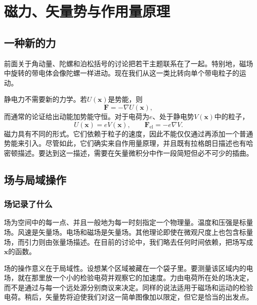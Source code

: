 \chapter{磁力、矢量势与作用量原理}


\section{一种新的力}

前面关于角动量、陀螺和泊松括号的讨论把若干主题联系在了一起。特别地，磁场中旋转的带电体会像陀螺一样进动。现在我们从这一类比转向单个带电粒子的运动。

静电力不需要新的力学。若\(U(\mathbf x)\)是势能，则
\begin{equation}
  \mathbf F=-\nabla U(\mathbf x),
\end{equation}
而通常的论证给出动能加势能守恒。对于电荷为\(e\)、处于静电势\(V(\mathbf x)\)中的粒子，
\begin{equation}
  U(\mathbf x)=eV(\mathbf x),
  \qquad
  \mathbf F_{\mathrm{el}}=-e\nabla V.
\end{equation}
磁力具有不同的形式。它们依赖于粒子的速度，因此不能仅仅通过再添加一个普通势能来引入。尽管如此，它们确实来自作用量原理，并且既有拉格朗日描述也有哈密顿描述。要达到这一描述，需要在矢量微积分中作一段简短但必不可少的插曲。

\section{场与局域操作}

\subsection{场记录了什么}

场为空间中的每一点、并且一般地为每一时刻指定一个物理量。温度和压强是标量场。风速是矢量场。电场和磁场是矢量场。其他理论即使在微观尺度上也包含标量场，而引力则由张量场描述。在目前的讨论中，我们略去任何时间依赖，把场写成\(\mathbf x\)的函数。

场的操作意义在于局域性。设想某个区域被藏在一个袋子里。要测量该区域内的电场，就在那里放一个小的检验电荷并观察它的加速度。力由电荷所在处的场决定，而不是通过与每一个远处源分别商议来决定。同样的说法适用于磁场和运动的检验电荷。稍后，矢量势将迫使我们对这一简单图像加以限定，但它是恰当的出发点。

